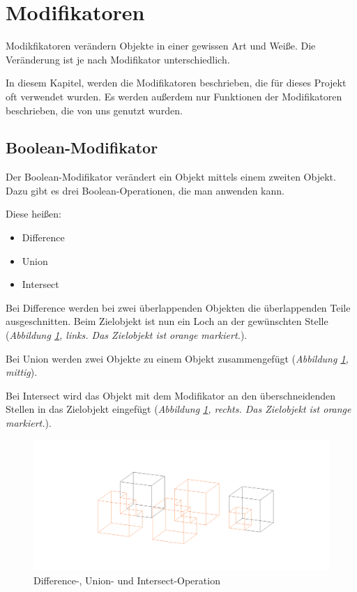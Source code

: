 \section{Modifikatoren}
Modikfikatoren verändern Objekte in einer gewissen Art und Weiße. Die Veränderung ist je nach Modifikator unterschiedlich.

In diesem Kapitel, werden die Modifikatoren beschrieben, die für dieses Projekt oft verwendet wurden.
Es werden außerdem nur Funktionen der Modifikatoren beschrieben, die von uns genutzt wurden.

\subsection{Boolean-Modifikator}
\label{Boolean:heading}
Der Boolean-Modifikator verändert ein Objekt mittels einem zweiten Objekt. Dazu gibt es
drei Boolean-Operationen, die man anwenden kann.\citep{blender:boolean_modifier}

Diese heißen:
\begin{itemize}
    \item  Difference
    \item  Union
    \item  Intersect
\end{itemize}

Bei Difference werden bei zwei überlappenden Objekten die überlappenden Teile ausgeschnitten. Beim Zielobjekt ist nun ein Loch an der gewünschten Stelle (\textit{Abbildung \ref{modifikatoren:image1}, links. Das Zielobjekt ist orange markiert.}).

Bei Union werden zwei Objekte zu einem Objekt zusammengefügt (\textit{Abbildung \ref{modifikatoren:image1}, mittig}).

Bei Intersect wird das Objekt mit dem Modifikator an den überschneidenden Stellen in das Zielobjekt eingefügt (\textit{Abbildung \ref{modifikatoren:image1}, rechts. Das Zielobjekt ist orange markiert.}).

\begin{figure}[h]
    \centering
    \includegraphics[width=.8\textwidth]{images/Modifikatoren-Boolean.png}
    \caption{Difference-, Union- und Intersect-Operation}
    \label{modifikatoren:image1}
\end{figure}

